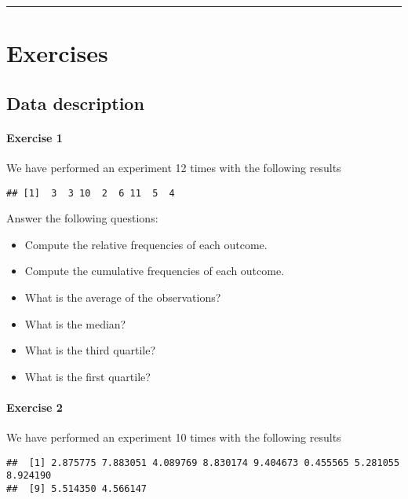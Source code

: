 \documentclass[
]{book}
\providecommand{\tightlist}{%
  \setlength{\itemsep}{0pt}\setlength{\parskip}{0pt}}
\begin{document}
\begin{center}\rule{0.5\linewidth}{0.5pt}\end{center}

\hypertarget{exercises}{%
\chapter{Exercises}\label{exercises}}

\hypertarget{data-description-1}{%
\section{Data description}\label{data-description-1}}

\hypertarget{exercise-1}{%
\subsubsection{Exercise 1}\label{exercise-1}}

We have performed an experiment 12 times with the following results

\begin{verbatim}
## [1]  3  3 10  2  6 11  5  4
\end{verbatim}

Answer the following questions:

\begin{itemize}
\tightlist
\item
  Compute the relative frequencies of each outcome.
\item
  Compute the cumulative frequencies of each outcome.
\item
  What is the average of the observations?
\item
  What is the median?
\item
  What is the third quartile?
\item
  What is the first quartile?
\end{itemize}

\hypertarget{exercise-2}{%
\subsubsection{Exercise 2}\label{exercise-2}}

We have performed an experiment 10 times with the following results

\begin{verbatim}
##  [1] 2.875775 7.883051 4.089769 8.830174 9.404673 0.455565 5.281055 8.924190
##  [9] 5.514350 4.566147
\end{verbatim}
\end{document}
